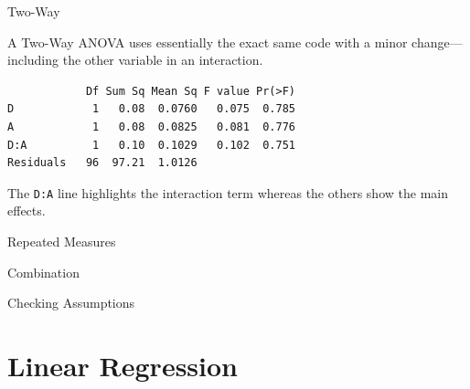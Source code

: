 \begin{frame}[fragile]{Two-Way}

A Two-Way ANOVA uses essentially the exact same code with a minor
change---including the other variable in an interaction.

\begin{Shaded}
\begin{Highlighting}[]
\StringTok{ }\OperatorTok{~}\StringTok{ }\OperatorTok{*}\StringTok{ }
\end{Highlighting}
\end{Shaded}

\begin{verbatim}
            Df Sum Sq Mean Sq F value Pr(>F)
D            1   0.08  0.0760   0.075  0.785
A            1   0.08  0.0825   0.081  0.776
D:A          1   0.10  0.1029   0.102  0.751
Residuals   96  97.21  1.0126               
\end{verbatim}

The \texttt{D:A} line highlights the interaction term whereas the others
show the main effects.

\end{frame}

\begin{frame}{Repeated Measures}

\end{frame}

\begin{frame}{Combination}

\end{frame}

\begin{frame}{Checking Assumptions}

\end{frame}

\section{Linear Regression}\label{linear-regression}

